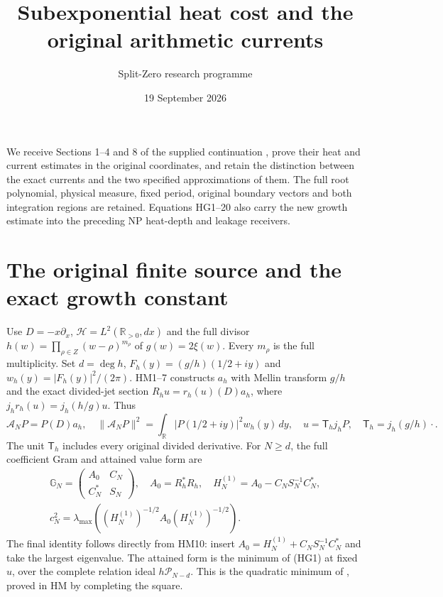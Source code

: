 \documentclass[11pt]{article}
\title{Subexponential heat cost and the original arithmetic currents}
\author{Split-Zero research programme}\date{19 September 2026}
\newcommand{\C}{\mathbb C}\newcommand{\R}{\mathbb R}
\begin{document}
\maketitle
We receive Sections 1--4 and 8 of the supplied continuation
\cite{web}, prove their heat and current estimates in the original
coordinates, and retain the distinction between the exact currents and
the two specified approximations of them. The full root polynomial,
physical measure, fixed period, original boundary vectors and both
integration regions are retained. Equations HG1--20 also carry the new
growth estimate into the preceding NP heat-depth and leakage receivers.

\section{The original finite source and the exact growth constant}
Use $D=-x\partial_x$, $\mathcal H=L^2(\R_{>0},dx)$ and the full divisor
$h(w)=\prod_{\rho\in Z}(w-\rho)^{m_\rho}$ of $g(w)=2\xi(w)$.
Every $m_\rho$ is the full multiplicity. Set $d=\deg h$,
$F_h(y)=(g/h)(1/2+iy)$ and $w_h(y)=|F_h(y)|^2/(2\pi)$.
HM1--7 \cite{HM} constructs $a_h$ with Mellin transform $g/h$ and
the exact divided-jet section $R_hu=r_h(u)(D)a_h$, where
$j_hr_h(u)=j_h(h/g)u$. Thus
\[
 \mathcal A_NP=P(D)a_h,\quad
 \|\mathcal A_NP\|^2=\int_\R|P(1/2+iy)|^2w_h(y)\,dy,
 \quad u=\mathsf T_hj_hP,\quad \mathsf T_h=j_h(g/h)\cdot .\tag{HG1}
\]
The unit $\mathsf T_h$ includes every original divided derivative.
For $N\ge d$, the full coefficient Gram and attained value form are
\[
\begin{gathered}
 \mathbb G_N=\begin{pmatrix}A_0&C_N\\C_N^*&S_N\end{pmatrix},\quad
 A_0=R_h^*R_h,\quad H_N^{(1)}=A_0-C_NS_N^{-1}C_N^*,
 \\
 c_N^2=\lambda_{\max}((H_N^{(1)})^{-1/2}A_0(H_N^{(1)})^{-1/2}).
\end{gathered}
 \tag{HG2}
\]
The final identity follows directly from HM10: insert
$A_0=H_N^{(1)}+C_NS_N^{-1}C_N^*$ and take the largest eigenvalue.
The attained form is the minimum of (HG1) at fixed $u$, over the complete
relation ideal $h\mathcal P_{N-d}$. This is the quadratic minimum of
\cite[Appendix C.4.1]{Boyd}, proved in HM by completing the square.
\end{document}
